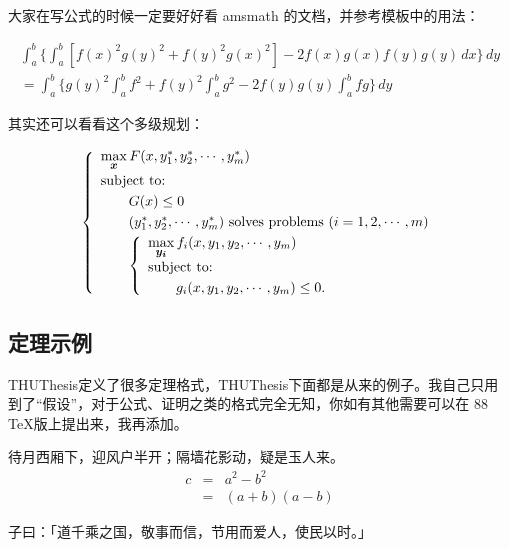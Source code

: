 大家在写公式的时候一定要好好看 \textsf{amsmath} 的文档，并参考模板中的用法：

\begin{multline*}\tag{[b]} %
\int_a^b\biggl\{\int_a^b[f(x)^2g(y)^2+f(y)^2g(x)^2]
 -2f(x)g(x)f(y)g(y)\,dx\biggr\}\,dy \\
 =\int_a^b\biggl\{g(y)^2\int_a^bf^2+f(y)^2
  \int_a^b g^2-2f(y)g(y)\int_a^b fg\biggr\}\,dy
\end{multline*}

其实还可以看看这个多级规划：

\begin{equation}\label{bilevel}
\left\{\begin{array}{l}
\max\limits_{{\mbox{\footnotesize\boldmath $x$}}} F(x,y_1^*,y_2^*,\cdots,y_m^*)\\[0.2cm]
\mbox{subject to:}\\[0.1cm]
\qquad G(x)\le 0\\[0.1cm]
\qquad(y_1^*,y_2^*,\cdots,y_m^*)\mbox{ solves problems }(i=1,2,\cdots,m)\\[0.1cm]
\qquad\left\{\begin{array}{l}
    \max\limits_{{\mbox{\footnotesize\boldmath $y_i$}}}f_i(x,y_1,y_2,\cdots,y_m)\\[0.2cm]
    \mbox{subject to:}\\[0.1cm]
    \qquad g_i(x,y_1,y_2,\cdots,y_m)\le 0.
    \end{array}\right.
\end{array}\right.
\end{equation}

\subsection{定理示例}

THUThesis定义了很多定理格式，THUThesis下面都是从来的例子。我自己只用到了“假设”，对于公式、证明之类的格式完全无知，你如有其他需要可以在 88 \TeX 版上提出来，我再添加。

\begin{hypo}
待月西厢下，迎风户半开；隔墙花影动，疑是玉人来。
\begin{eqnarray}
  \label{eq:eqnxmp}
  c & = & a^2 - b^2\\
    & = & (a+b)(a-b)
\end{eqnarray}
\end{hypo}

\begin{defin}
子曰：「道千乘之国，敬事而信，节用而爱人，使民以时。」
\end{defin}

